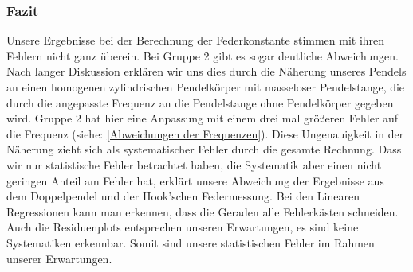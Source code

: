 \documentclass[12pt,a4paper]{article}
\begin{document}
\subsubsection{Fazit}
Unsere Ergebnisse bei der Berechnung der Federkonstante stimmen mit ihren Fehlern nicht ganz überein. Bei Gruppe 2 gibt es sogar deutliche Abweichungen. Nach langer Diskussion erklären wir uns dies durch die Näherung unseres Pendels an einen homogenen zylindrischen Pendelkörper mit masseloser Pendelstange, die durch die angepasste Frequenz an die Pendelstange ohne Pendelkörper gegeben wird. Gruppe 2 hat hier eine Anpassung mit einem drei mal größeren Fehler auf die Frequenz (siehe: \ref{Abweichungen der Frequenzen}). Diese Ungenauigkeit in der Näherung zieht sich als systematischer Fehler durch die gesamte Rechnung. Dass wir nur statistische Fehler betrachtet haben, die Systematik aber einen nicht geringen Anteil am Fehler hat, erklärt unsere Abweichung der Ergebnisse aus dem Doppelpendel und der Hook'schen Federmessung.
\newline
Bei den Linearen Regressionen kann man erkennen, dass die Geraden alle Fehlerkästen schneiden.
Auch die Residuenplots entsprechen unseren Erwartungen, es sind keine Systematiken erkennbar. Somit sind unsere statistischen Fehler im Rahmen unserer Erwartungen.
\end{document}
